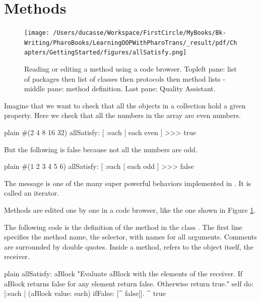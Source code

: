 \documentclass[10pt,twoside,english]{_support/latex/sbabook/sbabook}
\begin{document}
\section{Methods}

\begin{figure}

\begin{center}
\texttt{[image: /Users/ducasse/Workspace/FirstCircle/MyBooks/Bk-Writing/PharoBooks/LearningOOPWithPharoTrans/\_result/pdf/Chapters/GettingStarted/figures/allSatisfy.png]}\caption{Reading or editing a method using a code browser. Topleft pane: list of packages then list of classes then protocols then method lists - middle pane: method definition. Last pane: Quality Assistant.\label{fig:allSatisfy}}\end{center}
\end{figure}


Imagine that we want to check that all the objects in a collection hold a given property.
Here we check that all the numbers in the array are even numbers.

\begin{displaycode}{plain}
#(2 4 8 16 32) allSatisfy: [ :each | each even ]
>>> true
\end{displaycode}

But the following is false because not all the numbers are odd.  

\begin{displaycode}{plain}
#(1 2 3 4 5 6) allSatisfy: [ :each | each odd ]
>>> false
\end{displaycode}

The message  is one of the many super powerful behaviors implemented in . It is called an iterator.

Methods are edited one by one in a code browser, like the one shown in Figure \ref{fig:allSatisfy}.

The following code is the definition of the method  in the class . The first line specifies the method name, the selector, with names for all arguments. Comments are surrounded by double quotes. Inside a method,  refers to the object itself, the receiver.

\begin{displaycode}{plain}
allSatisfy: aBlock
	"Evaluate aBlock with the elements of the receiver.
	If aBlock returns false for any element return false.
	Otherwise return true."
	self do: [:each | (aBlock value: each) ifFalse: [^ false]].
	^ true
\end{displaycode}
\end{document}
